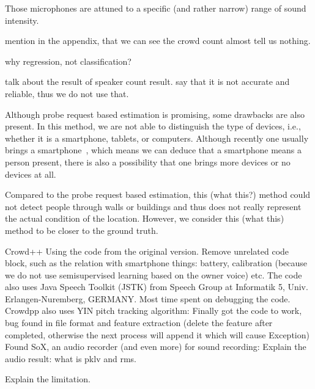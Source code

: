Those microphones are attuned to a specific (and rather narrow) range of sound intensity.

mention in the appendix, that we can see the crowd count almost tell us nothing.

why regression, not classification?

talk about the result of speaker count result. say that it is not accurate and reliable, thus we do not use that.

Although probe request based estimation is promising, some drawbacks are also present. In this method, we are not able to distinguish the type of devices, i.e., whether it is a smartphone, tablets, or computers. Although recently one usually brings a smartphone~\cite{thesis047}, which means we can deduce that a smartphone means a person present, there is also a possibility that one brings more devices or no devices at all.

Compared to the probe request based estimation, this (what this?) method could not detect people through walls or buildings and thus does not really represent the actual condition of the location. However, we consider this (what this) method to be closer to the ground truth.


Crowd++ Using the code from the original version.
Remove unrelated code block, such as the relation with smartphone things: battery, calibration (because we do not use semisupervised learning based on the owner voice) etc.
The code also uses Java Speech Toolkit (JSTK) from Speech Group at Informatik 5, Univ. Erlangen-Nuremberg, GERMANY.
Most time spent on debugging the code.
Crowdpp also uses YIN pitch tracking algorithm:
Finally got the code to work, bug found in file format and feature extraction (delete the feature after completed, otherwise the next process will append it which will cause Exception)
Found SoX, an audio recorder (and even more) for sound recording:
Explain the audio result: what is pklv and rms.

Explain the limitation.

